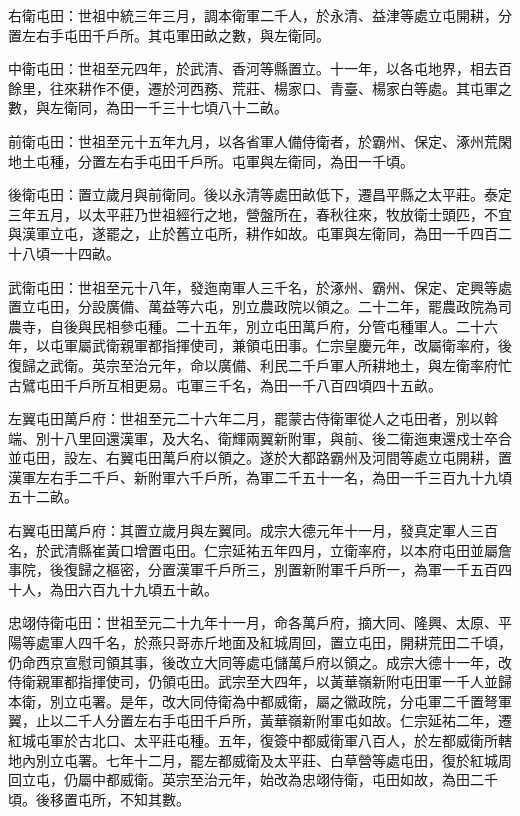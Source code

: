 \begin{pinyinscope}
 右衛屯田：世祖中統三年三月，調本衛軍二千人，於永清、益津等處立屯開耕，分置左右手屯田千戶所。其屯軍田畝之數，與左衛同。



 中衛屯田：世祖至元四年，於武清、香河等縣置立。十一年，以各屯地界，相去百餘里，往來耕作不便，遷於河西務、荒莊、楊家口、青臺、楊家白等處。其屯軍之數，與左衛同，為田一千三十七頃八十二畝。



 前衛屯田：世祖至元十五年九月，以各省軍人備侍衛者，於霸州、保定、涿州荒閑地土屯種，分置左右手屯田千戶所。屯軍與左衛同，為田一千頃。



 後衛屯田：置立歲月與前衛同。後以永清等處田畝低下，遷昌平縣之太平莊。泰定三年五月，以太平莊乃世祖經行之地，營盤所在，春秋往來，牧放衛士頭匹，不宜與漢軍立屯，遂罷之，止於舊立屯所，耕作如故。屯軍與左衛同，為田一千四百二十八頃一十四畝。



 武衛屯田：世祖至元十八年，發迤南軍人三千名，於涿州、霸州、保定、定興等處置立屯田，分設廣備、萬益等六屯，別立農政院以領之。二十二年，罷農政院為司農寺，自後與民相參屯種。二十五年，別立屯田萬戶府，分管屯種軍人。二十六年，以屯軍屬武衛親軍都指揮使司，兼領屯田事。仁宗皇慶元年，改屬衛率府，後復歸之武衛。英宗至治元年，命以廣備、利民二千戶軍人所耕地土，與左衛率府忙古鷿屯田千戶所互相更易。屯軍三千名，為田一千八百四頃四十五畝。



 左翼屯田萬戶府：世祖至元二十六年二月，罷蒙古侍衛軍從人之屯田者，別以斡端、別十八里回還漢軍，及大名、衛輝兩翼新附軍，與前、後二衛迤東還戍士卒合並屯田，設左、右翼屯田萬戶府以領之。遂於大都路霸州及河間等處立屯開耕，置漢軍左右手二千戶、新附軍六千戶所，為軍二千五十一名，為田一千三百九十九頃五十二畝。



 右翼屯田萬戶府：其置立歲月與左翼同。成宗大德元年十一月，發真定軍人三百名，於武清縣崔黃口增置屯田。仁宗延祐五年四月，立衛率府，以本府屯田並屬詹事院，後復歸之樞密，分置漢軍千戶所三，別置新附軍千戶所一，為軍一千五百四十人，為田六百九十九頃五十畝。



 忠翊侍衛屯田：世祖至元二十九年十一月，命各萬戶府，摘大同、隆興、太原、平陽等處軍人四千名，於燕只哥赤斤地面及紅城周回，置立屯田，開耕荒田二千頃，仍命西京宣慰司領其事，後改立大同等處屯儲萬戶府以領之。成宗大德十一年，改侍衛親軍都指揮使司，仍領屯田。武宗至大四年，以黃華嶺新附屯田軍一千人並歸本衛，別立屯署。是年，改大同侍衛為中都威衛，屬之徽政院，分屯軍二千置弩軍翼，止以二千人分置左右手屯田千戶所，黃華嶺新附軍屯如故。仁宗延祐二年，遷紅城屯軍於古北口、太平莊屯種。五年，復簽中都威衛軍八百人，於左都威衛所轄地內別立屯署。七年十二月，罷左都威衛及太平莊、白草營等處屯田，復於紅城周回立屯，仍屬中都威衛。英宗至治元年，始改為忠翊侍衛，屯田如故，為田二千頃。後移置屯所，不知其數。




\end{pinyinscope}

